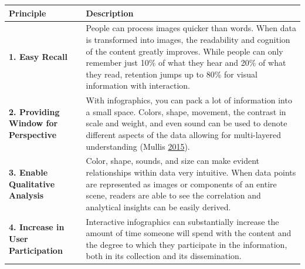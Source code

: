 \documentclass[]{book}
\theoremstyle{definition}
\theoremstyle{definition}
\theoremstyle{definition}
\theoremstyle{remark}
\begin{document}
\begin{longtable}[]{@{}ll@{}}
\toprule
\begin{minipage}[b]{0.16\columnwidth}\raggedright\strut
\textbf{Principle}\strut
\end{minipage} & \begin{minipage}[b]{0.78\columnwidth}\raggedright\strut
\textbf{Description}\strut
\end{minipage}\tabularnewline
\midrule
\endhead
\begin{minipage}[t]{0.16\columnwidth}\raggedright\strut
\textbf{1. Easy Recall}\strut
\end{minipage} & \begin{minipage}[t]{0.78\columnwidth}\raggedright\strut
People can process images quicker than words. When data is transformed
into images, the readability and cognition of the content greatly
improves. While people can only remember just 10\% of what they hear and
20\% of what they read, retention jumps up to 80\% for visual
information with interaction.\strut
\end{minipage}\tabularnewline
\begin{minipage}[t]{0.16\columnwidth}\raggedright\strut
\textbf{2. Providing Window for Perspective}\strut
\end{minipage} & \begin{minipage}[t]{0.78\columnwidth}\raggedright\strut
With infographics, you can pack a lot of information into a small space.
Colors, shape, movement, the contrast in scale and weight, and even
sound can be used to denote different aspects of the data allowing for
multi-layered understanding (Mullis
\protect\hyperlink{ref-image_good}{2015}).\strut
\end{minipage}\tabularnewline
\begin{minipage}[t]{0.16\columnwidth}\raggedright\strut
\textbf{3. Enable Qualitative Analysis}\strut
\end{minipage} & \begin{minipage}[t]{0.78\columnwidth}\raggedright\strut
Color, shape, sounds, and size can make evident relationships within
data very intuitive. When data points are represented as images or
components of an entire scene, readers are able to see the correlation
and analytical insights can be easily derived.\strut
\end{minipage}\tabularnewline
\begin{minipage}[t]{0.16\columnwidth}\raggedright\strut
\textbf{4. Increase in User Participation}\strut
\end{minipage} & \begin{minipage}[t]{0.78\columnwidth}\raggedright\strut
Interactive infographics can substantially increase the amount of time
someone will spend with the content and the degree to which they
participate in the information, both in its collection and its
dissemination.\strut
\end{minipage}\tabularnewline
\bottomrule
\end{longtable}
\end{document}
